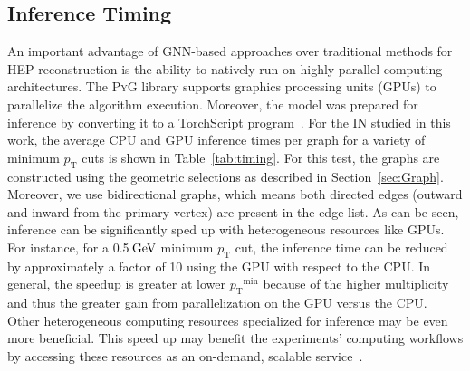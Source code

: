 \documentclass[twocolumn]{svjour3}
\newcommand{\pt}{\ensuremath{p_{\mathrm{T}}}\xspace}
\newcommand{\GeV}{\ensuremath{\,\text{Ge\hspace{-.08em}V}}\xspace}
\begin{document}
\subsection{Inference Timing}
\label{sec:timing}

An important advantage of GNN-based approaches over traditional methods for HEP reconstruction is the ability to natively run on highly parallel computing architectures.
The \textsc{PyG} library supports graphics processing units (GPUs) to parallelize the algorithm execution.
Moreover, the model was prepared for inference by converting it to a TorchScript program~\cite{torchscript}.
For the IN studied in this work, the average CPU and GPU inference times per graph for a variety of minimum $\pt$ cuts is shown in Table~\ref{tab:timing}.
For this test, the graphs are constructed using the geometric selections as described in Section~\ref{sec:Graph}. 
Moreover, we use bidirectional graphs, which means both directed edges (outward and inward from the primary vertex) are present in the edge list.
As can be seen, inference can be significantly sped up with heterogeneous resources like GPUs.
For instance, for a 0.5\GeV minimum \pt cut, the inference time can be reduced by approximately a factor of 10 using the GPU with respect to the CPU.
In general, the speedup is greater at lower $\pt^\mathrm{min}$ because of the higher multiplicity and thus the greater gain from parallelization on the GPU versus the CPU.
Other heterogeneous computing resources specialized for inference may be even more beneficial. 
This speed up may benefit the experiments' computing workflows by accessing these resources as an on-demand, scalable service~\cite{Krupa:2020bwg,Rankin:2020usv,Wang:2020fjr}.
\end{document}
